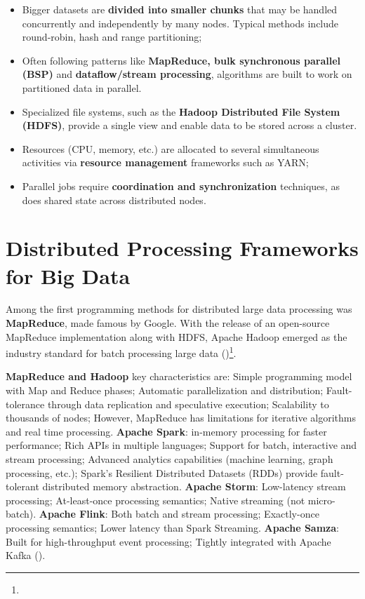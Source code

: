 \begin{itemize}
    \item Bigger datasets are \textbf{divided into smaller chunks} that may be handled concurrently and independently by many nodes. Typical methods include round-robin, hash and range partitioning;
    \item Often following patterns like \textbf{MapReduce, bulk synchronous parallel (BSP) }and \textbf{dataflow/stream processing}, algorithms are built to work on partitioned data in parallel.
    \item Specialized file systems, such as the \textbf{Hadoop Distributed File System (HDFS)}, provide a single view and enable data to be stored across a cluster.
    \item Resources (CPU, memory, etc.) are allocated to several simultaneous activities via \textbf{resource management }frameworks such as YARN;
    \item Parallel jobs require \textbf{coordination and synchronization} techniques, as does shared state across distributed nodes.
\end{itemize}

\section{Distributed Processing Frameworks for Big Data}

Among the first programming methods for distributed large data processing was \textbf{MapReduce}, made famous by Google. With the release of an open-source MapReduce implementation along with HDFS, Apache Hadoop emerged as the industry standard for batch processing large data (\cite{Fadiya2018TheIO})\footnote[28]{}.

\textbf{MapReduce and Hadoop} key characteristics are: Simple programming model with Map and Reduce phases; Automatic parallelization and distribution; Fault-tolerance through data replication and speculative execution; Scalability to thousands of nodes; However, MapReduce has limitations for iterative algorithms and real time processing. \textbf{Apache Spark}: in-memory processing for faster performance; Rich APIs in multiple languages; Support for batch, interactive and stream processing; Advanced analytics capabilities (machine learning, graph processing, etc.); Spark's Resilient Distributed Datasets (RDDs) provide fault-tolerant distributed memory abstraction. \textbf{Apache Storm}: Low-latency stream processing; At-least-once processing semantics; Native streaming (not micro-batch). \textbf{Apache Flink}: Both batch and stream processing; Exactly-once processing semantics; Lower latency than Spark Streaming. \textbf{Apache Samza}: Built for high-throughput event processing; Tightly integrated with Apache Kafka (\cite{Wingerath2016RealtimeSP})\footnotemark[29].


